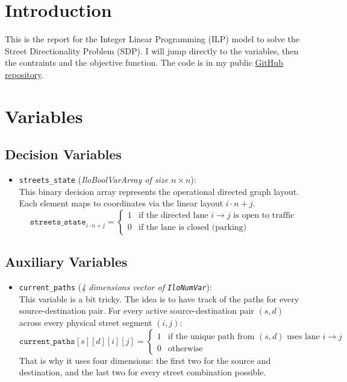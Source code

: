 \section*{Introduction}
This is the report for the Integer Linear Programming (ILP) model to solve the Street Directionality Problem (SDP).
I will jump directly to the variables, then the contraints and the objective function. 
The code is in my public \href{https://github.com/channelEs/CPS_MIRI}{GitHub repository}.

\section*{Variables}

\subsection*{Decision Variables}
\begin{itemize}
    \item \texttt{streets\_state} (\textit{IloBoolVarArray of size $n \times n$}): \\
    This binary decision array represents the operational directed graph layout. Each element maps to coordinates via the linear layout $i \cdot n + j$. 
    \begin{equation}
        \texttt{streets\_state}_{i \cdot n + j} = 
        \begin{cases} 
            1 & \text{if the directed lane } i \to j \text{ is open to traffic} \\
            0 & \text{if the lane is closed (parking)}
        \end{cases}
    \end{equation}
\end{itemize}

\subsection*{Auxiliary Variables}
\begin{itemize}
    \item \texttt{current\_paths} (\textit{4 dimensions vector of \texttt{IloNumVar}}): \\
    This variable is a bit tricky. The idea is to have track of the paths for every source-destination pair.
    For every active source-destination pair $(s,d)$ across every physical street segment $(i,j)$:
    \begin{equation}
        \texttt{current\_paths}[s][d][i][j] = 
        \begin{cases} 
            1 & \text{if the unique path from $(s,d)$ uses lane } i \to j \\
            0 & \text{otherwise}
        \end{cases}
    \end{equation}
    That is why it uses four dimensions: the first two for the source and destination, and the last two for every street combination possible.
\end{itemize}

